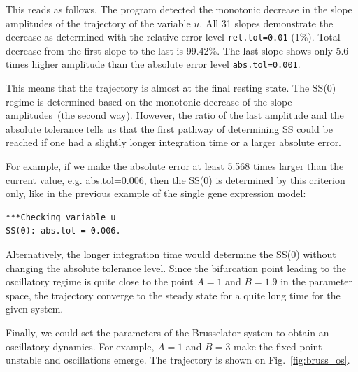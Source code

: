 \documentclass[11pt,a4paper]{article}
\begin{document}
This reads as follows. The program detected the monotonic decrease in the slope
amplitudes of the trajectory of the variable $u$. All 31 slopes demonstrate the
decrease as determined with the relative error level
\texttt{rel.tol=0.01} (1\%). Total decrease from the first slope to the last is
99.42\%. The last slope shows only 5.6 times higher amplitude than the absolute error
level \texttt{abs.tol=0.001}.

This means that the trajectory is almost at the final resting state. The SS(0) regime
is determined based on the monotonic decrease of the slope amplitudes~(the second
way). However, the ratio of the last amplitude and the absolute tolerance tells us
that the first pathway of determining SS could be reached if one had a slightly
longer integration time or a larger absolute error.

For example, if we make the absolute error at least 5.568 times larger than the
current value, e.g. abs.tol=0.006, then the SS(0) is determined by this criterion
only, like in the previous example of the single gene expression model:
\begin{verbatim}
***Checking variable u
SS(0): abs.tol = 0.006.
\end{verbatim}
Alternatively, the longer integration time would determine the SS(0) without changing
the absolute tolerance level. Since the bifurcation point leading to the oscillatory
regime is quite close to the point $A=1$ and $B=1.9$ in the parameter space, the
trajectory converge to the steady state for a quite long time for the given system.

Finally, we could set the parameters of the Brusselator system to obtain an
oscillatory dynamics. For example, $A=1$ and $B=3$ make the fixed point unstable and
oscillations emerge. The trajectory is shown on Fig.~\ref{fig:bruss_os}.
\end{document}

